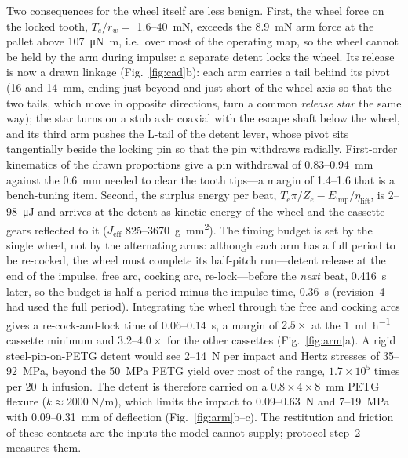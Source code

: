 \documentclass[11pt,a4paper]{article}
\begin{document}
Two consequences for the wheel itself are less benign. First, the wheel force on the locked tooth, $T_e/r_w = $ 1.6--\SI{40}{\milli\newton}, exceeds the \SI{8.9}{\milli\newton} arm force at the pallet above \SI{107}{\micro\newton\metre}, i.e.\ over most of the operating map, so the wheel cannot be held by the arm during impulse: a separate detent locks the wheel. Its release is now a drawn linkage (Fig.~\ref{fig:cad}b): each arm carries a tail behind its pivot (16 and \SI{14}{\milli\metre}, ending just beyond and just short of the wheel axis so that the two tails, which move in opposite directions, turn a common \emph{release star} the same way); the star turns on a stub axle coaxial with the escape shaft below the wheel, and its third arm pushes the L-tail of the detent lever, whose pivot sits tangentially beside the locking pin so that the pin withdraws radially. First-order kinematics of the drawn proportions give a pin withdrawal of 0.83--\SI{0.94}{\milli\metre} against the \SI{0.6}{\milli\metre} needed to clear the tooth tips---a margin of 1.4--1.6 that is a bench-tuning item. Second, the surplus energy per beat, $T_e\pi/Z_e - E_{\mathrm{imp}}/\eta_{\mathrm{lift}}$, is 2--\SI{98}{\micro\joule} and arrives at the detent as kinetic energy of the wheel and the cassette gears reflected to it ($J_{\mathrm{eff}}$ 825--\SI{3670}{\gram\milli\metre\squared}). The timing budget is set by the single wheel, not by the alternating arms: although each arm has a full period to be re-cocked, the wheel must complete its half-pitch run---detent release at the end of the impulse, free arc, cocking arc, re-lock---before the \emph{next} beat, \SI{0.416}{\second} later, so the budget is half a period minus the impulse time, \SI{0.36}{\second} (revision~4 had used the full period). Integrating the wheel through the free and cocking arcs gives a re-cock-and-lock time of 0.06--\SI{0.14}{\second}, a margin of $2.5\times$ at the \SI{1}{\milli\litre\per\hour} cassette minimum and 3.2--$4.0\times$ for the other cassettes (Fig.~\ref{fig:arm}a). A rigid steel-pin-on-PETG detent would see 2--\SI{14}{\newton} per impact and Hertz stresses of 35--\SI{92}{\mega\pascal}, beyond the \SI{50}{\mega\pascal} PETG yield over most of the range, $1.7\times10^{5}$ times per \SI{20}{\hour} infusion. The detent is therefore carried on a $0.8\times4\times8$~\si{\milli\metre} PETG flexure ($k \approx \SI{2000}{\newton\per\metre}$), which limits the impact to 0.09--\SI{0.63}{\newton} and 7--\SI{19}{\mega\pascal} with 0.09--\SI{0.31}{\milli\metre} of deflection (Fig.~\ref{fig:arm}b--c). The restitution and friction of these contacts are the inputs the model cannot supply; protocol step~2 measures them.
\end{document}
